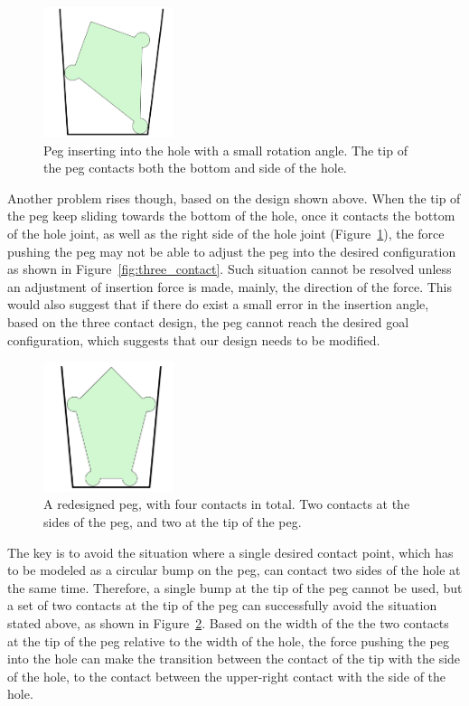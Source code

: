\documentclass[11pt, twocolumn]{article}
\begin{document}
\begin{figure}
\begin{center}
\includegraphics[width=1.5in]{figures/contact_bottom.png}
\end{center}
\caption{Peg inserting into the hole with a small rotation angle. The tip of the peg contacts both the bottom and side of the hole. }
\label{fig:contact_bottom}
\end{figure}

Another problem rises though, based on the design shown above. When the tip of the peg keep sliding towards the bottom of the hole, once it contacts the bottom of the hole joint, as well as the right side of the hole joint (Figure~\ref{fig:contact_bottom}), the force pushing the peg may not be able to adjust the peg into the desired configuration as shown in Figure~\ref{fig:three_contact}. Such situation cannot be resolved unless an adjustment of insertion force is made, mainly, the direction of the force. This would also suggest that if there do exist a small error in the insertion angle, based on the three contact design, the  peg cannot reach the desired goal configuration, which suggests that our design needs to be modified. 

\begin{figure}
\begin{center}
\includegraphics[width=1.5in]{figures/four_contact.png}
\end{center}
\caption{A redesigned peg, with four contacts in total. Two contacts at the sides of the peg, and two at the tip of the peg. }
\label{fig:four_contact}
\end{figure}

The key is to avoid the situation where a single desired contact point, which has to be modeled as a circular bump on the peg, can contact two sides of the hole at the same time. Therefore, a single bump at the tip of the peg cannot be used, but a set of two contacts at the tip of the peg can successfully avoid the situation stated above, as shown in Figure~\ref{fig:four_contact}. Based on the width of the the two contacts at the tip of the peg relative to the width of the hole, the force pushing the peg into the hole can make the transition between the contact of the tip with the side of the hole, to the contact between the upper-right contact with the side of the hole. 
\end{document}
